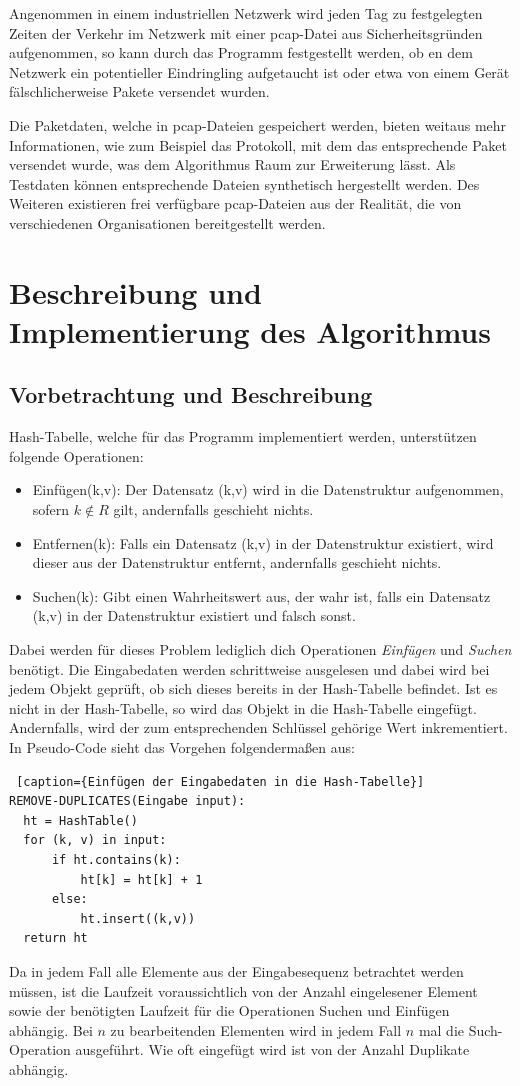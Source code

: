 Angenommen in einem industriellen Netzwerk wird jeden Tag zu festgelegten Zeiten der Verkehr im Netzwerk mit einer pcap-Datei aus Sicherheitsgründen aufgenommen, so kann durch das Programm festgestellt werden, ob en dem Netzwerk ein potentieller Eindringling aufgetaucht ist oder etwa von einem Gerät fälschlicherweise Pakete versendet wurden.

Die Paketdaten, welche in pcap-Dateien gespeichert werden, bieten weitaus mehr Informationen, wie zum Beispiel das Protokoll, mit dem das entsprechende Paket versendet wurde, was dem Algorithmus Raum zur Erweiterung lässt. Als Testdaten können entsprechende Dateien synthetisch hergestellt werden. Des Weiteren existieren frei verfügbare pcap-Dateien aus der Realität, die von verschiedenen Organisationen bereitgestellt werden.

\chapter{Beschreibung und Implementierung des Algorithmus}
\section{Vorbetrachtung und Beschreibung}
Hash-Tabelle, welche für das Programm implementiert werden, unterstützen folgende Operationen:
\begin{itemize}	
	\item Einfügen(k,v): Der Datensatz (k,v) wird in die Datenstruktur aufgenommen, sofern \(k\notin{R}\) gilt, andernfalls geschieht nichts.
	\item Entfernen(k): Falls ein Datensatz (k,v) in der Datenstruktur existiert, wird dieser aus der Datenstruktur entfernt, andernfalls geschieht nichts.
	\item Suchen(k): Gibt einen Wahrheitswert aus, der wahr ist, falls ein Datensatz (k,v) in der Datenstruktur existiert und falsch sonst.
\end{itemize}
Dabei werden für dieses Problem lediglich dich Operationen \textit{Einfügen} und \textit{Suchen} benötigt. Die Eingabedaten werden schrittweise ausgelesen und dabei wird bei jedem Objekt geprüft, ob sich dieses bereits in der Hash-Tabelle befindet. Ist es nicht in der Hash-Tabelle, so wird das Objekt in die Hash-Tabelle eingefügt. Andernfalls, wird der zum entsprechenden Schlüssel gehörige Wert inkrementiert. 
\newpage
In Pseudo-Code sieht das Vorgehen folgendermaßen aus:
\begin{lstlisting} [caption={Einfügen der Eingabedaten in die Hash-Tabelle}]
REMOVE-DUPLICATES(Eingabe input):
  ht = HashTable()
  for (k, v) in input:
      if ht.contains(k):
          ht[k] = ht[k] + 1
      else:
          ht.insert((k,v))
  return ht
\end{lstlisting}
Da in jedem Fall alle Elemente aus der Eingabesequenz betrachtet werden müssen, ist die Laufzeit voraussichtlich von der Anzahl eingelesener Element sowie der benötigten Laufzeit für die Operationen Suchen und Einfügen abhängig. Bei \(n\) zu bearbeitenden Elementen wird in jedem Fall \(n\) mal die Such-Operation ausgeführt. Wie oft eingefügt wird ist von der Anzahl Duplikate abhängig. 

